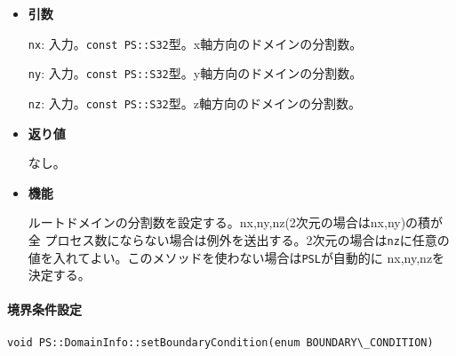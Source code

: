 \begin{itemize}

\item{{\bf 引数}}

{\tt nx}: 入力。{\tt const PS::S32}型。x軸方向のドメインの分割数。

{\tt ny}: 入力。{\tt const PS::S32}型。y軸方向のドメインの分割数。

{\tt nz}: 入力。{\tt const PS::S32}型。z軸方向のドメインの分割数。

\item{{\bf 返り値}}

なし。

\item{{\bf 機能}}

ルートドメインの分割数を設定する。nx,ny,nz(2次元の場合はnx,ny)の積が全
プロセス数にならない場合は例外を送出する。2次元の場合は{\tt nz}に任意の
値を入れてよい。このメソッドを使わない場合は{\tt PSL}が自動的に
nx,ny,nzを決定する。

\end{itemize}


\paragraph{境界条件設定}
\mbox{}

\begin{screen}
\begin{verbatim}
void PS::DomainInfo::setBoundaryCondition(enum BOUNDARY\_CONDITION)
\end{verbatim}
\end{screen}

